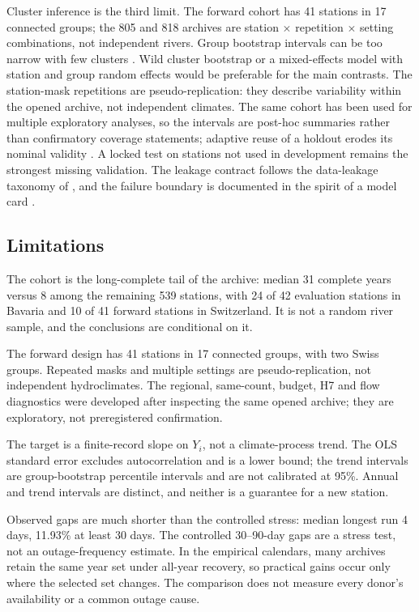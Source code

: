 Cluster inference is the third limit. The forward cohort has 41 stations in 17 connected groups; the 805 and 818 archives are station $\times$ repetition $\times$ setting combinations, not independent rivers. Group bootstrap intervals can be too narrow with few clusters \citep{cameron2008}. Wild cluster bootstrap or a mixed-effects model with station and group random effects would be preferable for the main contrasts. The station-mask repetitions are pseudo-replication: they describe variability within the opened archive, not independent climates. The same cohort has been used for multiple exploratory analyses, so the intervals are post-hoc summaries rather than confirmatory coverage statements; adaptive reuse of a holdout erodes its nominal validity \citep{dwork2015}. A locked test on stations not used in development remains the strongest missing validation. The leakage contract follows the data-leakage taxonomy of \citet{kapoor2023}, and the failure boundary is documented in the spirit of a model card \citep{mitchell2019}.

\subsection{Limitations}

The cohort is the long-complete tail of the archive: median 31 complete years versus 8 among the remaining 539 stations, with 24 of 42 evaluation stations in Bavaria and 10 of 41 forward stations in Switzerland. It is not a random river sample, and the conclusions are conditional on it.

The forward design has 41 stations in 17 connected groups, with two Swiss groups. Repeated masks and multiple settings are pseudo-replication, not independent hydroclimates. The regional, same-count, budget, H7 and flow diagnostics were developed after inspecting the same opened archive; they are exploratory, not preregistered confirmation.

The target is a finite-record slope on $Y_i$, not a climate-process trend. The OLS standard error excludes autocorrelation and is a lower bound; the trend intervals are group-bootstrap percentile intervals and are not calibrated at 95\%. Annual and trend intervals are distinct, and neither is a guarantee for a new station.

Observed gaps are much shorter than the controlled stress: median longest run 4 days, 11.93\% at least 30 days. The controlled 30--90-day gaps are a stress test, not an outage-frequency estimate. In the empirical calendars, many archives retain the same year set under all-year recovery, so practical gains occur only where the selected set changes. The comparison does not measure every donor's availability or a common outage cause.

